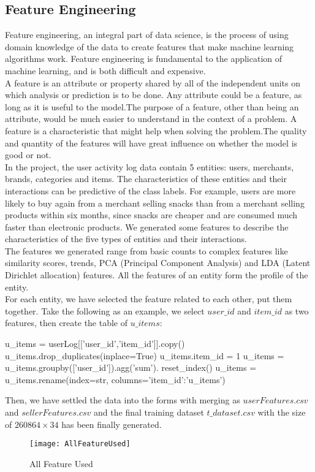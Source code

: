 \documentclass[sigconf]{acmart}
\begin{document}
\subsection{Feature Engineering}
Feature engineering, an integral part of data science, is the process of using domain knowledge of the data to create features that make machine learning algorithms work. Feature engineering is fundamental to the application of machine learning, and is both difficult and expensive.\\
\indent
A feature is an attribute or property shared by all of the independent units on which analysis or prediction is to be done. Any attribute could be a feature, as long as it is useful to the model.The purpose of a feature, other than being an attribute, would be much easier to understand in the context of a problem. A feature is a characteristic that might help when solving the problem.The quality and quantity of the features will have great influence on whether the model is good or not.\\
\indent
In the project, the user activity log data contain 5 entities: users, merchants, brands, categories and items. The characteristics of these entities and their interactions can be predictive of the class labels. For example, users are more likely to buy again from a merchant selling snacks than from a merchant selling products within six months, since snacks are cheaper and are consumed much faster than electronic products. We generated some features to describe the characteristics of the ﬁve types of entities and their interactions.\\
\indent
The features we generated range from basic counts to complex features like similarity scores, trends, PCA (Principal Component Analysis) and LDA (Latent Dirichlet allocation) features. All the features of an entity form the proﬁle of the entity.\\ 
\indent
For each entity, we have selected the feature related to each other, put them together. Take the following as an example, we select $user\_id$ and $item\_id$ as two features, then create the table of $u\_items$: \\
\begin{python}
u_items = userLog[['user_id','item_id']].copy()
u_items.drop_duplicates(inplace=True)
u_items.item_id = 1
u_items = u_items.groupby(['user_id']).agg('sum').
reset_index()
u_items = u_items.rename(index=str,
columns={'item_id':'u_items'})
\end{python}
\indent
Then, we have settled the data into the forms with merging as $userFeatures.csv$ and $sellerFeatures.csv$ and the final training dataset $t\_dataset.csv$ with the size of $ 260864\times34$ has been finally generated.\\
\begin{figure}[htbp]

\centering
\texttt{[image: AllFeatureUsed]}
\caption{All Feature Used} \label{fig: All Feature Used}
\end{figure}
\end{document}
